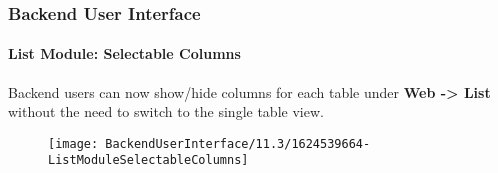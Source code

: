 %

\begin{frame}[fragile]
	\frametitle{Backend User Interface}
	\framesubtitle{List Module: Selectable Columns}

	Backend users can now show/hide columns for each table under
	\textbf{Web -> List} without the need to switch to the single table view.

	\begin{figure}
		\texttt{[image: BackendUserInterface/11.3/1624539664-ListModuleSelectableColumns]}
	\end{figure}

\end{frame}

